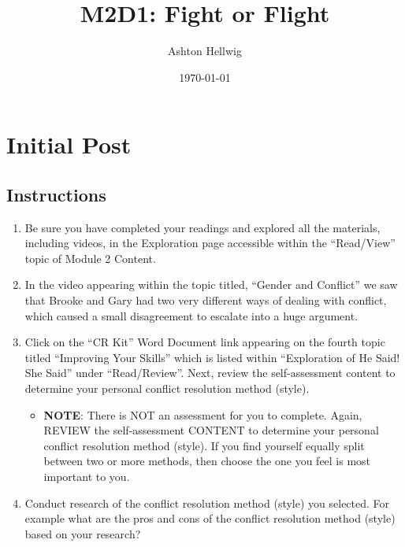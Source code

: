 \documentclass[stu,12pt]{apa7}
\title{%
    M2D1: Fight or Flight
  }
\author{Ashton Hellwig}
\date{\today}
\begin{document}
  \maketitle

  \section{Initial Post}
    \subsection*{Instructions}
      \begin{enumerate}
        \item Be sure you have completed your readings and explored all the
          materials, including videos, in the Exploration page accessible within
          the ``Read/View'' topic of Module 2 Content.
        \item In the video appearing within the topic titled, ``Gender and
          Conflict'' we saw that Brooke and Gary had two very different ways of
          dealing with conflict, which caused a small disagreement to escalate
          into a huge argument.
        \item Click on the ``CR Kit'' Word Document link appearing on the fourth
          topic titled ``Improving Your Skills'' which is listed within
          ``Exploration of He Said! She Said'' under ``Read/Review''. Next,
          review the self-assessment content to determine your personal conflict
          resolution method (style).
          \begin{itemize}
            \item \textbf{NOTE}: There is NOT an assessment for you to complete.
              Again, REVIEW the self-assessment CONTENT to determine your
              personal conflict resolution method (style). If you find yourself
              equally split between two or more methods, then choose the one you
              feel is most important to you.
          \end{itemize}
        \item Conduct research of the conflict resolution method (style) you
          selected. For example what are the pros and cons of the conflict
          resolution method (style) based on your research?
      \end{enumerate}


\end{document}
